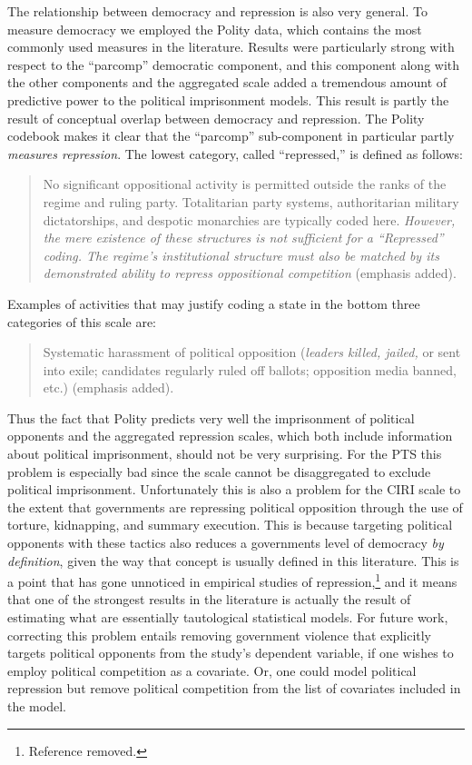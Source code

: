 \documentclass[12pt]{article}
\begin{document}
The relationship between democracy and repression is also very general. To measure democracy we employed the Polity data, which contains the most commonly used measures in the literature. Results were particularly strong with respect to the ``parcomp'' democratic component, and this component along with the other components and the aggregated scale added a tremendous amount of predictive power to the political imprisonment models. This result is partly the result of conceptual overlap between democracy and repression. The Polity codebook \citep[][p.\ 26]{MarshallJaggers2009} makes it clear that the ``parcomp'' sub-component in particular partly {\it measures repression}. The lowest category, called ``repressed,'' is defined as follows:
\begin{quote}
No significant oppositional activity is permitted outside the ranks of the regime and ruling party. Totalitarian party systems, authoritarian military dictatorships, and despotic monarchies are typically coded here. {\it However, the mere existence of these structures is not sufficient for a ``Repressed'' coding. The regime's institutional structure must also be matched by its demonstrated ability to repress oppositional competition} (emphasis added).
\end{quote}
\noindent
Examples of activities that may justify coding a state in the bottom three categories of this scale are:
\begin{quote}
Systematic harassment of political opposition ({\em leaders killed, jailed,} or sent into exile; candidates regularly ruled off ballots; opposition media banned, etc.) (emphasis added). 
\end{quote}
\noindent
Thus the fact that Polity predicts very well the imprisonment of political opponents and the aggregated repression scales, which both include information about political imprisonment, should not be very surprising. For the PTS this problem is especially bad since the scale cannot be disaggregated to exclude political imprisonment. Unfortunately this is also a problem for the CIRI scale to the extent that governments are repressing political opposition through the use of torture, kidnapping, and summary execution. This is because targeting political opponents with these tactics also reduces a governments level of democracy {\it by definition}, given the way that concept is usually defined in this literature. This is a point that has gone unnoticed in empirical studies of repression,\footnote{Reference removed.} and it means that one of the strongest results in the literature is actually the result of estimating what are essentially tautological statistical models. For future work, correcting this problem entails removing government violence that explicitly targets political opponents from the study's dependent variable, if one wishes to employ political competition as a covariate. Or, one could model political repression but remove political competition from the list of covariates included in the model. 
\end{document}
